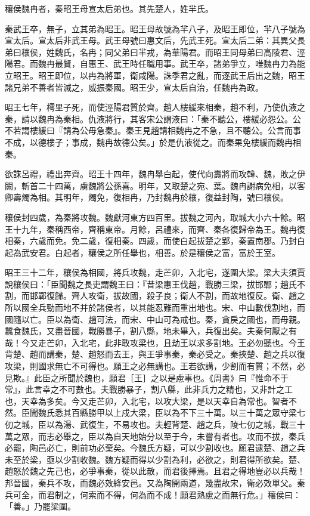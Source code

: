 
\begin{pinyinscope}
穰侯魏冉者，秦昭王母宣太后弟也。其先楚人，姓羋氏。

秦武王卒，無子，立其弟為昭王。昭王母故號為羋八子，及昭王即位，羋八子號為宣太后。宣太后非武王母。武王母號曰惠文后，先武王死。宣太后二弟：其異父長弟曰穰侯，姓魏氏，名冉；同父弟曰羋戎，為華陽君。而昭王同母弟曰高陵君、涇陽君。而魏冉最賢，自惠王、武王時任職用事。武王卒，諸弟爭立，唯魏冉力為能立昭王。昭王即位，以冉為將軍，衛咸陽。誅季君之亂，而逐武王后出之魏，昭王諸兄弟不善者皆滅之，威振秦國。昭王少，宣太后自治，任魏冉為政。

昭王七年，樗里子死，而使涇陽君質於齊。趙人樓緩來相秦，趙不利，乃使仇液之秦，請以魏冉為秦相。仇液將行，其客宋公謂液曰：「秦不聽公，樓緩必怨公。公不若謂樓緩曰『請為公毋急秦』。秦王見趙請相魏冉之不急，且不聽公。公言而事不成，以德樓子；事成，魏冉故德公矣。」於是仇液從之。而秦果免樓緩而魏冉相秦。

欲誅呂禮，禮出奔齊。昭王十四年，魏冉舉白起，使代向壽將而攻韓、魏，敗之伊闕，斬首二十四萬，虜魏將公孫喜。明年，又取楚之宛、葉。魏冉謝病免相，以客卿壽燭為相。其明年，燭免，復相冉，乃封魏冉於穰，復益封陶，號曰穰侯。

穰侯封四歲，為秦將攻魏。魏獻河東方四百里。拔魏之河內，取城大小六十餘。昭王十九年，秦稱西帝，齊稱東帝。月餘，呂禮來，而齊、秦各復歸帝為王。魏冉復相秦，六歲而免。免二歲，復相秦。四歲，而使白起拔楚之郢，秦置南郡。乃封白起為武安君。白起者，穰侯之所任舉也，相善。於是穰侯之富，富於王室。

昭王三十二年，穰侯為相國，將兵攻魏，走芒卯，入北宅，遂圍大梁。梁大夫須賈說穰侯曰：「臣聞魏之長吏謂魏王曰：『昔梁惠王伐趙，戰勝三梁，拔邯鄲；趙氏不割，而邯鄲復歸。齊人攻衛，拔故國，殺子良；衛人不割，而故地復反。衛、趙之所以國全兵勁而地不并於諸侯者，以其能忍難而重出地也。宋、中山數伐割地，而國隨以亡。臣以為衛、趙可法，而宋、中山可為戒也。秦，貪戾之國也，而毋親。蠶食魏氏，又盡晉國，戰勝暴子，割八縣，地未畢入，兵復出矣。夫秦何厭之有哉！今又走芒卯，入北宅，此非敢攻梁也，且劫王以求多割地。王必勿聽也。今王背楚、趙而講秦，楚、趙怒而去王，與王爭事秦，秦必受之。秦挾楚、趙之兵以復攻梁，則國求無亡不可得也。願王之必無講也。王若欲講，少割而有質；不然，必見欺。』此臣之所聞於魏也，願君［王］之以是慮事也。《周書》曰『惟命不于常』，此言幸之不可數也。夫戰勝暴子，割八縣，此非兵力之精也，又非計之工也，天幸為多矣。今又走芒卯，入北宅，以攻大梁，是以天幸自為常也。智者不然。臣聞魏氏悉其百縣勝甲以上戍大梁，臣以為不下三十萬。以三十萬之眾守梁七仞之城，臣以為湯、武復生，不易攻也。夫輕背楚、趙之兵，陵七仞之城，戰三十萬之眾，而志必舉之，臣以為自天地始分以至于今，未嘗有者也。攻而不拔，秦兵必罷，陶邑必亡，則前功必棄矣。今魏氏方疑，可以少割收也。願君逮楚、趙之兵未至於梁，亟以少割收魏。魏方疑而得以少割為利，必欲之，則君得所欲矣。楚、趙怒於魏之先己也，必爭事秦，從以此散，而君後擇焉。且君之得地豈必以兵哉！邦晉國，秦兵不攻，而魏必效絳安邑。又為陶開兩道，幾盡故宋，衛必效單父。秦兵可全，而君制之，何索而不得，何為而不成！願君熟慮之而無行危。」穰侯曰：「善。」乃罷梁圍。


\end{pinyinscope}
